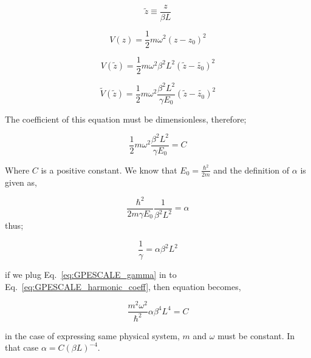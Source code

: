 \documentclass[a4paper,times,hidelinks,12pt]{article}
\begin{document}
\begin{equation}
\label{eq:GPESCALE_dimensionless_length}
    \widetilde{z} \equiv \frac{z}{\beta L} 
\end{equation}

\begin{equation}
\label{eq:GPESCALE_harmonic_potential}
    V(z) = \frac{1}{2}m\omega^2 (z-z_0)^2
\end{equation}

\begin{equation}
\label{eq:GPESCALE_harmonic_length_transform}
    V(\widetilde{z}) = \frac{1}{2}m\omega^2 \beta^2 L^2 (\widetilde{z}-\widetilde{z_0})^2
\end{equation}

\begin{equation}
\label{eq:GPESCALE_harmonic_energy_transform}
    \widetilde{V}(\widetilde{z}) = \frac{1}{2} m\omega^2 \frac{\beta^2 L^2}{\gamma E_0} (\widetilde{z}-\widetilde{z_0})^2  
\end{equation}

The coefficient of this equation must be dimensionless, therefore;

\begin{equation}
\label{eq:GPESCALE_harmonic_coeff}
    \frac{1}{2} m\omega^2 \frac{\beta^2 L^2}{\gamma E_0} = C
\end{equation}

Where $C$ is a positive constant. We know that $E_0 = \frac{\hbar^2}{2m}$ and the definition of $\alpha$ is given as,

\begin{equation}
\label{eq:GPESCALE_alpha}
    \frac{\hbar^2}{2m\gamma E_0} \frac{1}{\beta^2 L^2} = \alpha
\end{equation}
thus;

\begin{equation}
\label{eq:GPESCALE_gamma}
     \frac{1}{\gamma} = \alpha \beta^2 L^2
\end{equation}

if we plug Eq.~\eqref{eq:GPESCALE_gamma} in to Eq.~\eqref{eq:GPESCALE_harmonic_coeff}, then equation becomes,

\begin{equation}
\label{eq:GPESCALE_harmonic_coeff_2}
    \frac{m^2\omega^2}{\hbar^2} \alpha \beta^4 L^4 = C 
\end{equation} 

in the case of expressing same physical system, $m$ and $\omega$ must be constant. In that case $\alpha = C (\beta L)^{-4}$.\\
\end{document}

